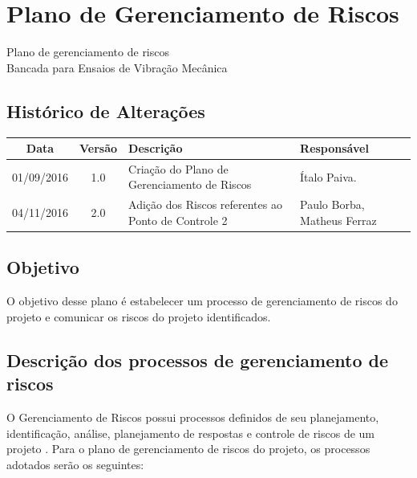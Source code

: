 

\chapter{Plano de Gerenciamento de Riscos}
  	\label{plano_de_riscos}
% 	


\begin{center}
 {\large Plano de gerenciamento de riscos}\\[0.2cm]
 {Bancada para Ensaios de Vibração Mecânica}\\
 \end{center}

 \section*{Histórico de Alterações}
\begin{table}[h]
\centering
\begin{tabular}{|c|c|p{6cm}|p{5cm}|}

Data & Versão & Descrição & Responsável\\
\hline
01/09/2016 & 1.0 & Criação do Plano de Gerenciamento de Riscos & Ítalo Paiva. \\ \hline
04/11/2016 & 2.0 & Adição dos Riscos referentes ao Ponto de Controle 2 & Paulo Borba, Matheus Ferraz \\ \hline
\end{tabular}
\end{table}

\section*{Objetivo}
O objetivo desse plano é estabelecer um processo de gerenciamento de riscos do projeto e comunicar os riscos do projeto identificados.

\section*{Descrição dos processos de gerenciamento de riscos}

O Gerenciamento de Riscos possui processos definidos de seu planejamento, identificação, análise, planejamento de respostas e controle de riscos de um projeto \cite{pmbok}.
Para o plano de gerenciamento de riscos do projeto, os processos adotados serão os seguintes:

